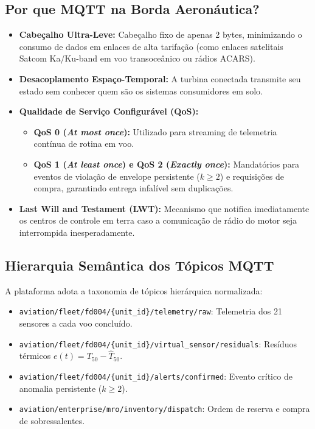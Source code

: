 \subsection{Por que MQTT na Borda Aeronáutica?}
\begin{itemize}
    \item \textbf{Cabeçalho Ultra-Leve:} Cabeçalho fixo de apenas 2 bytes, minimizando o consumo de dados em enlaces de alta tarifação (como enlaces satelitais Satcom Ka/Ku-band em voo transoceânico ou rádios ACARS).
    \item \textbf{Desacoplamento Espaço-Temporal:} A turbina conectada transmite seu estado sem conhecer quem são os sistemas consumidores em solo.
    \item \textbf{Qualidade de Serviço Configurável (QoS):}
    \begin{itemize}
        \item \textbf{QoS 0 (\textit{At most once}):} Utilizado para streaming de telemetria contínua de rotina em voo.
        \item \textbf{QoS 1 (\textit{At least once}) e QoS 2 (\textit{Exactly once}):} Mandatórios para eventos de violação de envelope persistente ($k \ge 2$) e requisições de compra, garantindo entrega infalível sem duplicações.
    \end{itemize}
    \item \textbf{Last Will and Testament (LWT):} Mecanismo que notifica imediatamente os centros de controle em terra caso a comunicação de rádio do motor seja interrompida inesperadamente.
\end{itemize}

\subsection{Hierarquia Semântica dos Tópicos MQTT}
A plataforma adota a taxonomia de tópicos hierárquica normalizada:
\begin{itemize}
    \item \texttt{aviation/fleet/fd004/\{unit\_id\}/telemetry/raw}: Telemetria dos 21 sensores a cada voo concluído.
    \item \texttt{aviation/fleet/fd004/\{unit\_id\}/virtual\_sensor/residuals}: Resíduos térmicos $e(t) = T_{50} - \widehat{T}_{50}$.
    \item \texttt{aviation/fleet/fd004/\{unit\_id\}/alerts/confirmed}: Evento crítico de anomalia persistente ($k \ge 2$).
    \item \texttt{aviation/enterprise/mro/inventory/dispatch}: Ordem de reserva e compra de sobressalentes.
\end{itemize}

